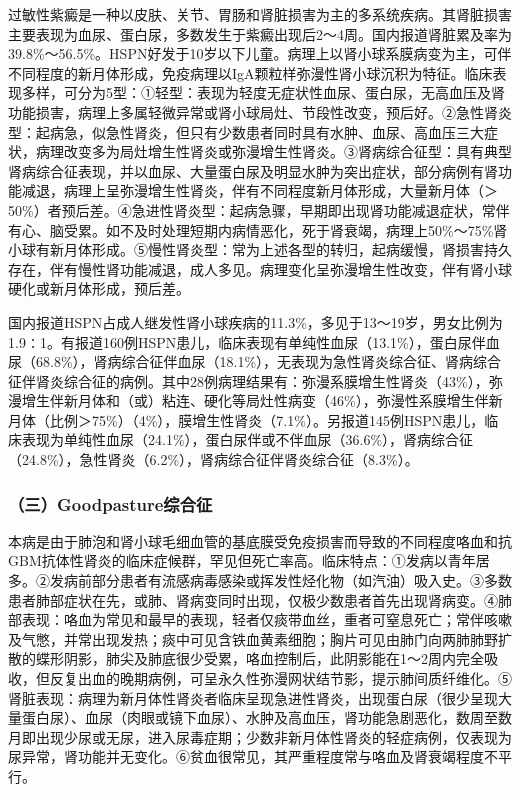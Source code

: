 过敏性紫癜是一种以皮肤、关节、胃肠和肾脏损害为主的多系统疾病。其肾脏损害主要表现为血尿、蛋白尿，多数发生于紫癜出现后2～4周。国内报道肾脏累及率为39.8\%～56.5\%。HSPN好发于10岁以下儿童。病理上以肾小球系膜病变为主，可伴不同程度的新月体形成，免疫病理以IgA颗粒样弥漫性肾小球沉积为特征。临床表现多样，可分为5型：①轻型：表现为轻度无症状性血尿、蛋白尿，无高血压及肾功能损害，病理上多属轻微异常或肾小球局灶、节段性改变，预后好。②急性肾炎型：起病急，似急性肾炎，但只有少数患者同时具有水肿、血尿、高血压三大症状，病理改变多为局灶增生性肾炎或弥漫增生性肾炎。③肾病综合征型：具有典型肾病综合征表现，并以血尿、大量蛋白尿及明显水肿为突出症状，部分病例有肾功能减退，病理上呈弥漫增生性肾炎，伴有不同程度新月体形成，大量新月体（＞50\%）者预后差。④急进性肾炎型：起病急骤，早期即出现肾功能减退症状，常伴有心、脑受累。如不及时处理短期内病情恶化，死于肾衰竭，病理上50\%～75\%肾小球有新月体形成。⑤慢性肾炎型：常为上述各型的转归，起病缓慢，肾损害持久存在，伴有慢性肾功能减退，成人多见。病理变化呈弥漫增生性改变，伴有肾小球硬化或新月体形成，预后差。

国内报道HSPN占成人继发性肾小球疾病的11.3\%，多见于13～19岁，男女比例为1.9∶1。有报道160例HSPN患儿，临床表现有单纯性血尿（13.1\%），蛋白尿伴血尿（68.8\%），肾病综合征伴血尿（18.1\%），无表现为急性肾炎综合征、肾病综合征伴肾炎综合征的病例。其中28例病理结果有：弥漫系膜增生性肾炎（43\%），弥漫增生伴新月体和（或）粘连、硬化等局灶性病变（46\%），弥漫性系膜增生伴新月体（比例＞75\%）（4\%），膜增生性肾炎（7.1\%）。另报道145例HSPN患儿，临床表现为单纯性血尿（24.1\%），蛋白尿伴或不伴血尿（36.6\%），肾病综合征（24.8\%），急性肾炎（6.2\%），肾病综合征伴肾炎综合征（8.3\%）。

\subsubsection{（三）Goodpasture综合征}

本病是由于肺泡和肾小球毛细血管的基底膜受免疫损害而导致的不同程度咯血和抗GBM抗体性肾炎的临床症候群，罕见但死亡率高。临床特点：①发病以青年居多。②发病前部分患者有流感病毒感染或挥发性烃化物（如汽油）吸入史。③多数患者肺部症状在先，或肺、肾病变同时出现，仅极少数患者首先出现肾病变。④肺部表现：咯血为常见和最早的表现，轻者仅痰带血丝，重者可窒息死亡；常伴咳嗽及气憋，并常出现发热；痰中可见含铁血黄素细胞；胸片可见由肺门向两肺肺野扩散的蝶形阴影，肺尖及肺底很少受累，咯血控制后，此阴影能在1～2周内完全吸收，但反复出血的晚期病例，可呈永久性弥漫网状结节影，提示肺间质纤维化。⑤肾脏表现：病理为新月体性肾炎者临床呈现急进性肾炎，出现蛋白尿（很少呈现大量蛋白尿）、血尿（肉眼或镜下血尿）、水肿及高血压，肾功能急剧恶化，数周至数月即出现少尿或无尿，进入尿毒症期；少数非新月体性肾炎的轻症病例，仅表现为尿异常，肾功能并无变化。⑥贫血很常见，其严重程度常与咯血及肾衰竭程度不平行。

